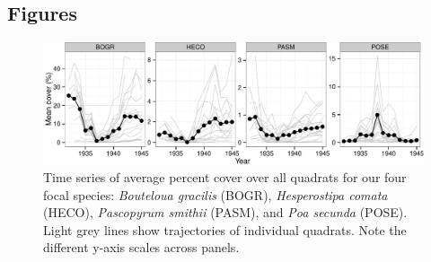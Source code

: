\documentclass[12pt,]{article}
\begin{document}
\pagebreak{}

\subsection{Figures}\label{figures}

\begin{figure}[htbp]
\centering
\includegraphics{components/figure/manuscript-figure_1.pdf}
\caption{Time series of average percent cover over all quadrats for our
four focal species: \emph{Bouteloua gracilis} (BOGR), \emph{Hesperostipa
comata} (HECO), \emph{Pascopyrum smithii} (PASM), and \emph{Poa secunda}
(POSE). Light grey lines show trajectories of individual quadrats. Note
the different y-axis scales across panels.}
\end{figure}
\end{document}
